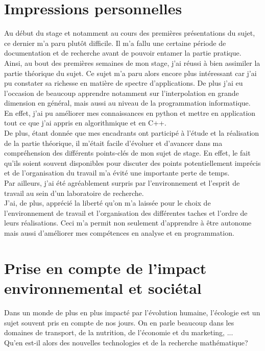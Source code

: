 \section{Impressions personnelles}\label{sec:7}
\hspace{0.5cm}
Au début du stage et notamment au cours des premières présentations du sujet, ce dernier m'a paru
plutôt difficile. Il m'a fallu une certaine période de documentation et de recherche avant de pouvoir entamer la partie pratique.
Ainsi, au bout des premières semaines de mon stage, j'ai réussi à bien assimiler la partie théorique du sujet.
Ce sujet m'a paru alors encore plus intéressant car j'ai pu constater sa richesse en matière de spectre d'applications. De plus j'ai eu l'occasion
de beaucoup apprendre notamment sur l'interpolation en grande dimension en général, mais aussi au niveau de la programmation informatique. En effet, j'ai
pu améliorer mes connaissances en python et mettre en application tout ce que j'ai appris en algorithmique et en C++.\\

De plus, étant donnée que mes encadrants ont participé à l'étude et la réalisation de la partie théorique, il m'était facile d'évoluer
et d'avancer dans ma compréhension des différents points-clés de mon sujet de stage. En effet, le fait qu'ils soient souvent disponibles
pour discuter des points potentiellement imprécis et de l'organisation du travail m'a évité une importante perte de temps.\\
Par ailleurs, j'ai été agréablement surpris par l'environnement et l'esprit de travail au sein d'un laboratoire de recherche.\\
J'ai, de plus, apprécié la liberté qu'on m'a laissée pour le choix de l'environnement de travail et l'organisation des différentes taches et l'ordre de leurs réalisations.
Ceci m'a permit non seulement d'apprendre à être autonome mais aussi d'améliorer mes compétences en analyse et en programmation.

\section{Prise en compte de l’impact environnemental et sociétal}\label{sec:8}
\hspace{0.5cm}
Dans un monde de plus en plus impacté par l’évolution humaine, l’écologie est un sujet
souvent pris en compte de nos jours. On en parle beaucoup dans les domaines de transport, de la nutrition, de l'économie et du marketing, ...\\
Qu’en est-il alors des nouvelles technologies et de la recherche mathématique?\\

